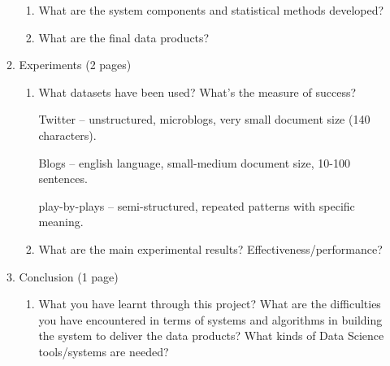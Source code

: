 \documentclass{article}
\begin{document}
\begin{enumerate}
\begin{enumerate}
\begin{enumerate}
    \item What are the system components and statistical methods developed?
    \item What are the final data products?
    \end{enumerate}

  \item Experiments (2 pages)
    \begin{enumerate}
    \item What datasets have been used? What’s the measure of success?


      Twitter -- unstructured, microblogs, very small document size (140 characters).

      Blogs -- english language, small-medium document size, 10-100 sentences.

      play-by-plays -- semi-structured, repeated patterns with specific meaning.

    \item What are the main experimental results? Effectiveness/performance?
    \end{enumerate}

  \item Conclusion (1 page)
    \begin{enumerate}\item What you have learnt through this project?
      What are the difficulties you have encountered in terms of systems and algorithms in building the system to deliver the data products?
      What kinds of Data Science tools/systems are needed?
    \end{enumerate}
  \end{enumerate}
\end{enumerate}
\end{document}
